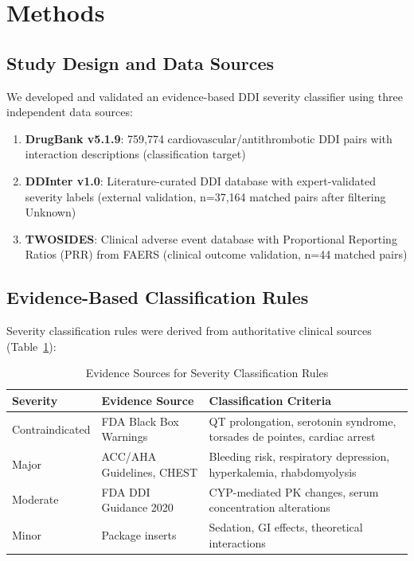 \documentclass[11pt,a4paper]{article}
\begin{document}
\section*{Methods}

\subsection*{Study Design and Data Sources}

We developed and validated an evidence-based DDI severity classifier using three independent data sources:

\begin{enumerate}
\item \textbf{DrugBank v5.1.9}: 759,774 cardiovascular/antithrombotic DDI pairs with interaction descriptions (classification target)
\item \textbf{DDInter v1.0}: Literature-curated DDI database with expert-validated severity labels \cite{ddinter2022} (external validation, n=37,164 matched pairs after filtering Unknown)
\item \textbf{TWOSIDES}: Clinical adverse event database with Proportional Reporting Ratios (PRR) from FAERS \cite{tatonetti2012} (clinical outcome validation, n=44 matched pairs)
\end{enumerate}

\subsection*{Evidence-Based Classification Rules}

Severity classification rules were derived from authoritative clinical sources (Table~\ref{tab:rules}):

\begin{table}[h]
\centering
\small
\caption{Evidence Sources for Severity Classification Rules}
\label{tab:rules}
\begin{tabular}{@{}llp{6cm}@{}}
\toprule
\textbf{Severity} & \textbf{Evidence Source} & \textbf{Classification Criteria} \\
\midrule
Contraindicated & FDA Black Box Warnings & QT prolongation, serotonin syndrome, torsades de pointes, cardiac arrest \\
Major & ACC/AHA Guidelines, CHEST & Bleeding risk, respiratory depression, hyperkalemia, rhabdomyolysis \\
Moderate & FDA DDI Guidance 2020 & CYP-mediated PK changes, serum concentration alterations \\
Minor & Package inserts & Sedation, GI effects, theoretical interactions \\
\bottomrule
\end{tabular}
\end{table}
\end{document}
